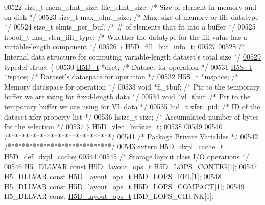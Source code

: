\begin{DoxyCode}
00522     \textcolor{keywordtype}{size\_t}      mem\_elmt\_size, file\_elmt\_size;       \textcolor{comment}{/* Size of element in memory and on disk */}
00523     \textcolor{keywordtype}{size\_t}      max\_elmt\_size;          \textcolor{comment}{/* Max. size of memory or file datatype */}
00524     \textcolor{keywordtype}{size\_t}      elmts\_per\_buf;          \textcolor{comment}{/* # of elements that fit into a buffer */}
00525     hbool\_t     has\_vlen\_fill\_type;     \textcolor{comment}{/* Whether the datatype for the fill value has a variable-length
       component */}
00526 \} \hyperlink{struct_h5_d__fill__buf__info__t}{H5D\_fill\_buf\_info\_t};
00527 
00528 \textcolor{comment}{/* Internal data structure for computing variable-length dataset's total size */}
\hyperlink{struct_h5_d__vlen__bufsize__t}{00529} \textcolor{keyword}{typedef} \textcolor{keyword}{struct }\{
00530     \hyperlink{struct_h5_d__t}{H5D\_t} *dset;        \textcolor{comment}{/* Dataset for operation */}
00531     \hyperlink{struct_h5_s__t}{H5S\_t} *fspace;      \textcolor{comment}{/* Dataset's dataspace for operation */}
00532     \hyperlink{struct_h5_s__t}{H5S\_t} *mspace;      \textcolor{comment}{/* Memory dataspace for operation */}
00533     \textcolor{keywordtype}{void} *fl\_tbuf;      \textcolor{comment}{/* Ptr to the temporary buffer we are using for fixed-length data */}
00534     \textcolor{keywordtype}{void} *vl\_tbuf;      \textcolor{comment}{/* Ptr to the temporary buffer we are using for VL data */}
00535     hid\_t xfer\_pid;     \textcolor{comment}{/* ID of the dataset xfer property list */}
00536     hsize\_t size;       \textcolor{comment}{/* Accumulated number of bytes for the selection */}
00537 \} \hyperlink{struct_h5_d__vlen__bufsize__t}{H5D\_vlen\_bufsize\_t};
00538 
00539 
00540 \textcolor{comment}{/*****************************/}
00541 \textcolor{comment}{/* Package Private Variables */}
00542 \textcolor{comment}{/*****************************/}
00543 \textcolor{keyword}{extern} H5D\_dxpl\_cache\_t H5D\_def\_dxpl\_cache;
00544 
00545 \textcolor{comment}{/* Storage layout class I/O operations */}
00546 H5\_DLLVAR \textcolor{keyword}{const} \hyperlink{struct_h5_d__layout__ops__t}{H5D\_layout\_ops\_t} H5D\_LOPS\_CONTIG[1];
00547 H5\_DLLVAR \textcolor{keyword}{const} \hyperlink{struct_h5_d__layout__ops__t}{H5D\_layout\_ops\_t} H5D\_LOPS\_EFL[1];
00548 H5\_DLLVAR \textcolor{keyword}{const} \hyperlink{struct_h5_d__layout__ops__t}{H5D\_layout\_ops\_t} H5D\_LOPS\_COMPACT[1];
00549 H5\_DLLVAR \textcolor{keyword}{const} \hyperlink{struct_h5_d__layout__ops__t}{H5D\_layout\_ops\_t} H5D\_LOPS\_CHUNK[1];

\end{DoxyCode}
